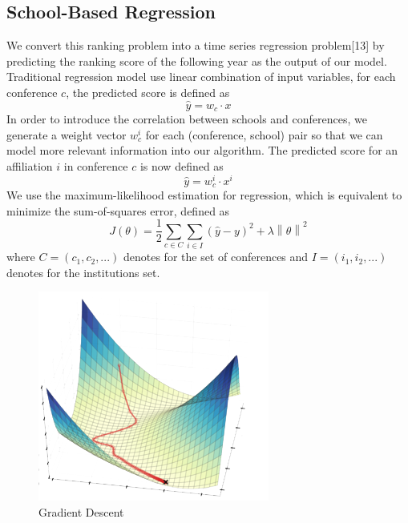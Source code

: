 \documentclass[letterpaper]{article}
\begin{document}
\subsection{School-Based Regression}
We convert this ranking problem into a time series regression problem[13] by predicting the ranking score of the following year as the output of our model. Traditional regression model use linear combination of input variables, for each conference $c$, the predicted score is defined as\\
\begin {equation}
\hat{y} = w_{c}\cdot x
\end{equation}
In order to introduce the correlation between schools and conferences, we generate a weight vector $w_{c}^{i}$ for each (conference, school) pair so that we can model more relevant information into our algorithm. The predicted score for an affiliation $i$ in conference $c$ is now defined as\\
\begin {equation}
\hat{y} = w_{c}^{i}\cdot x^{i}
\end{equation}
We use the maximum-likelihood estimation for regression, which is equivalent to minimize the sum-of-squares error, defined as
\begin{equation}
J\left ( \theta \right ) = \frac{1}{2} \sum_{c\in C}\sum_{i\in I} \left ( \hat{y} - y \right ) ^{2} + \lambda \left \| \theta \right \| ^{2} 
\end{equation}
where $C = (c_{1} ,c_{2},...)$ denotes for the set of conferences and $I = (i_{1} ,i_{2},...)$ denotes for the institutions set.
\begin{figure}[h]
    \centering
    \includegraphics[width=\linewidth]{GD.png}
    \caption{Gradient Descent}
    \label{fig:my_label}
\end{figure}
\end{document}
